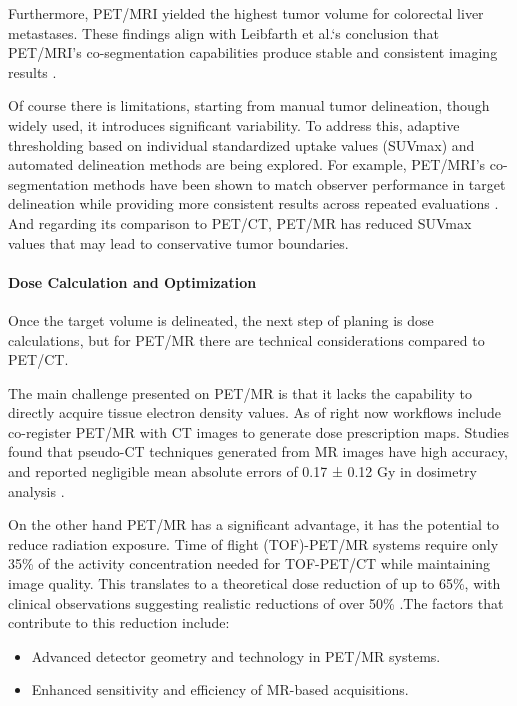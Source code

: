 \documentclass[11pt]{article} %
\begin{document}
\begin{multicols}{2}
Furthermore, PET/MRI yielded the highest tumor volume for colorectal liver metastases. These findings align with Leibfarth et al.‘s conclusion that PET/MRI’s co-segmentation capabilities produce stable and consistent imaging results \cite{yan2024}.

Of course there is limitations, starting from manual tumor delineation, though widely used, it introduces significant variability. To address this, adaptive thresholding based on individual standardized uptake values (SUVmax) and automated delineation methods are being explored. For example, PET/MRI’s co-segmentation methods have been shown to match observer performance in target delineation while providing more consistent results across repeated evaluations \cite{yan2024}. And regarding its comparison to PET/CT, PET/MR has reduced SUVmax values that may lead to conservative tumor boundaries.


\paragraph{Dose Calculation and Optimization}
Once the target volume is delineated, the next step of planing is dose calculations, but for PET/MR there are technical considerations compared to PET/CT.

The main challenge presented on PET/MR is that it lacks the capability to directly acquire tissue electron density values. As of right now workflows include co-register PET/MR with CT images to generate dose prescription maps. Studies found that pseudo-CT techniques generated from MR images have high accuracy, and reported negligible mean absolute errors of 0.17 ± 0.12 Gy in dosimetry analysis \cite{yan2024}.

On the other hand PET/MR has a significant advantage, it has the potential to reduce radiation exposure. Time of flight (TOF)-PET/MR systems require only 35\% of the activity concentration needed for TOF-PET/CT while maintaining image quality. This translates to a theoretical dose reduction of up to 65\%, with clinical observations suggesting realistic reductions of over 50\% \cite{Queiroz2015}.The factors that contribute to this reduction include:

\begin{itemize}
    \item Advanced detector geometry and technology in PET/MR systems.
    \item Enhanced sensitivity and efficiency of MR-based acquisitions.
\end{itemize}


\end{multicols}
\end{document}
